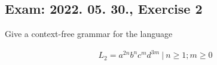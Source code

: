 \subsection{Exam: 2022. 05. 30., Exercise 2}


Give a context-free grammar for the language

\begin{align*}
L_2 = {a^{2n}b^{n}c^{m}d^{3m} ~|~ n\geq{}1; m\geq{}0}
\end{align*}



